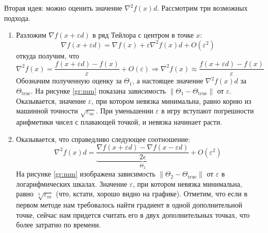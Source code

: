 \documentclass[a4paper, 12pt]{article}
\begin{document}
Вторая идея: можно оценить значение $\nabla^2 f(x) d$. Рассмотрим три возможных подхода.
\begin{enumerate}
    \item Разложим $\nabla f(x + \varepsilon d)$ в ряд Тейлора с центром в точке $x$:
    $$\nabla f(x + \varepsilon d) = \nabla f(x) + \varepsilon \nabla^2 f(x) d + O(\varepsilon^2)$$
    откуда получим, что
    $$\nabla^2 f(x) = \frac{f(x + \varepsilon d) - f(x)}{\varepsilon} + O(\varepsilon) \Rightarrow \nabla^2 f(x) \approx \frac{f(x + \varepsilon d) - f(x)}{\varepsilon}$$
    Обозначим полученную оценку за $\Theta_1$, а настоящее значение $\nabla^2 f(x) d$ за $\Theta_{\mathrm{true}}$. На рисунке \ref{gr:mm} показана зависимость $\|\Theta_1 - \Theta_{\mathrm{true}}\|$ от $\varepsilon$. Оказывается, значение $\varepsilon$, при котором невязка минимальна, равно корню из машинной точности $\sqrt{\varepsilon_m}$. При уменьшении $\varepsilon$ в игру вступают погрешности арифметики чисел с плавающей точкой, и невязка начинает расти.
    
    \item Оказывается, что справедливо следующее соотношение:
    $$
        \nabla^2 f(x) d = \underbrace{\frac{\nabla f(x + \varepsilon d) - \nabla f(x - \varepsilon d)}{2\epsilon}}_{\Theta_2} + O(\varepsilon^2)
    $$
    На рисунке \ref{gr:mm} изображена зависимость $\|\Theta_2 - \Theta_{\mathrm{true}}\|$ от $\varepsilon$ в логарифмических шкалах. Значение $\varepsilon$, при котором невязка минимальна, равно $\sqrt[3]{\varepsilon_m}$ (что, кстати, хорошо видно на графике). Отметим, что если в первом методе нам требовалось найти градиент в одной дополнительной точке, сейчас нам придется считать его в двух дополнительных точках, что более затратно по времени.
    

\end{enumerate}
\end{document}
